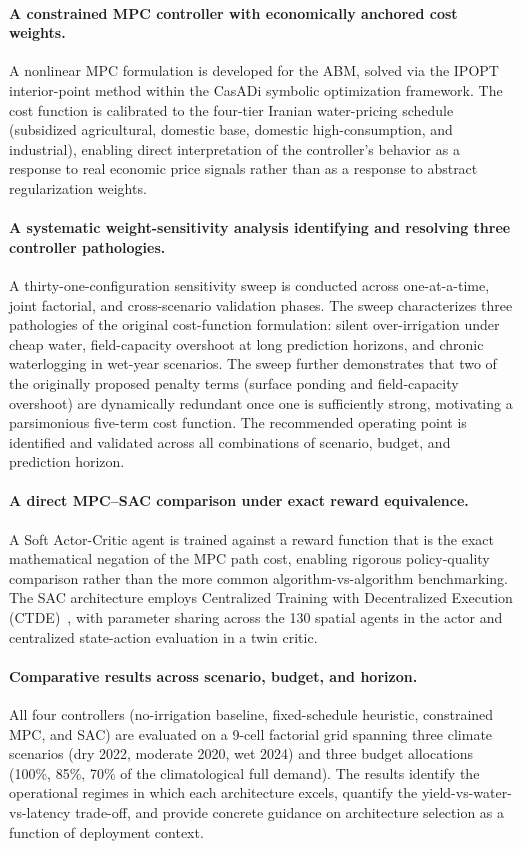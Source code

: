 \paragraph{A constrained MPC controller with economically anchored
cost weights.} A nonlinear MPC formulation is developed for the ABM,
solved via the IPOPT interior-point method within the CasADi symbolic
optimization framework. The cost function is calibrated to the
four-tier Iranian water-pricing schedule (subsidized agricultural,
domestic base, domestic high-consumption, and industrial), enabling
direct interpretation of the controller's behavior as a response to
real economic price signals rather than as a response to abstract
regularization weights.

\paragraph{A systematic weight-sensitivity analysis identifying and
resolving three controller pathologies.} A thirty-one-configuration
sensitivity sweep is conducted across one-at-a-time, joint factorial,
and cross-scenario validation phases. The sweep characterizes three
pathologies of the original cost-function formulation: silent
over-irrigation under cheap water, field-capacity overshoot at long
prediction horizons, and chronic waterlogging in wet-year scenarios.
The sweep further demonstrates that two of the originally proposed
penalty terms (surface ponding and field-capacity overshoot) are
dynamically redundant once one is sufficiently strong, motivating a
parsimonious five-term cost function. The recommended operating
point is identified and validated across all combinations of
scenario, budget, and prediction horizon.

\paragraph{A direct MPC--SAC comparison under exact reward
equivalence.} A Soft Actor-Critic agent is trained against a reward
function that is the exact mathematical negation of the MPC path
cost, enabling rigorous policy-quality comparison rather than the
more common algorithm-vs-algorithm benchmarking. The SAC architecture
employs Centralized Training with Decentralized Execution
(CTDE)~\cite{amato2024ctde}, with parameter sharing across the 130
spatial agents in the actor and centralized state-action evaluation
in a twin critic.

\paragraph{Comparative results across scenario, budget, and horizon.}
All four controllers (no-irrigation baseline, fixed-schedule
heuristic, constrained MPC, and SAC) are evaluated on a 9-cell
factorial grid spanning three climate scenarios (dry 2022, moderate
2020, wet 2024) and three budget allocations (100\%, 85\%, 70\% of
the climatological full demand). The results identify the operational
regimes in which each architecture excels, quantify the
yield-vs-water-vs-latency trade-off, and provide concrete guidance
on architecture selection as a function of deployment context.

